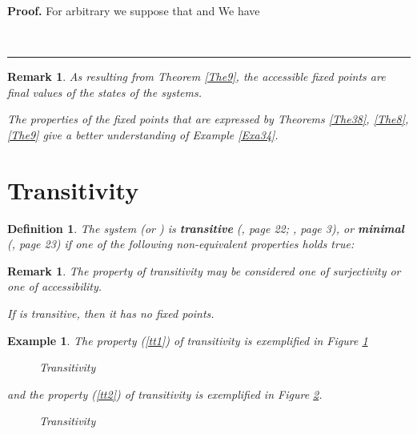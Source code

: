 \documentclass[12pt]{article}\usepackage{amsmath}
\newtheorem{definition}[theorem]{Definition}
\newtheorem{example}[theorem]{Example}
\newtheorem{remark}[theorem]{Remark}
\newenvironment{proof}[1][Proof]{\textbf{#1.} }{\ \rule{0.5em}{0.5em}}
\begin{document}
\begin{proof}
For arbitrary  we suppose that and We have 

\end{proof}

\begin{remark}
As resulting from Theorem \ref{The9}, the accessible fixed points are final
values of the states of the systems.

The properties of the fixed points that are expressed by Theorems \ref{The38},
\ref{The8}, \ref{The9} give a better understanding of Example \ref{Exa34}.
\end{remark}

\section{Transitivity}

\begin{definition}
\label{Def108}The system  (or ) is \textbf{transitive}
(\cite{bib4}, page 22; \cite{bib3}, page 3), or \textbf{minimal} (\cite{bib4},
page 23) if one of the following non-equivalent properties holds true:

\end{definition}

\begin{remark}
The property of transitivity may be considered one of surjectivity or one of accessibility.

If  is transitive, then it has no fixed points.
\end{remark}

\begin{example}
The property (\ref{tt1}) of transitivity is exemplified in Figure
\ref{minimality1}
\begin{figure}
[ptb]
\begin{center}
\caption{Transitivity}\label{minimality1}\end{center}
\end{figure}
and the property (\ref{tt2}) of transitivity is exemplified in Figure
\ref{minimality2}.
\begin{figure}
[ptb]
\begin{center}
\caption{Transitivity}\label{minimality2}\end{center}
\end{figure}

\end{example}
\end{document}
